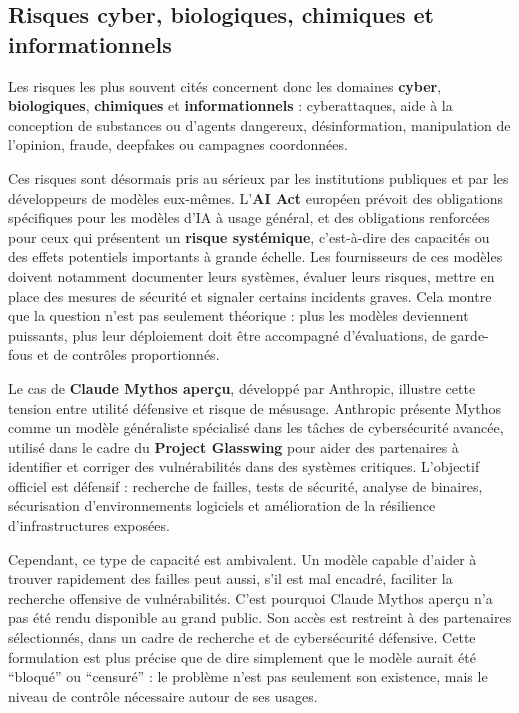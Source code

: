 \documentclass[
  10pt,
  a4paper,
  DIV=11,
  numbers=noendperiod,
  oneside]{scrreprt}
\let\oldtextbf\textbf
\renewcommand{\textbf}[1]{\oldtextbf{\textcolor{cmmnavy}{#1}}}
\begin{document}
\subsection{Risques cyber, biologiques, chimiques et
informationnels}\label{risques-cyber-biologiques-chimiques-et-informationnels}

Les risques les plus souvent cités concernent donc les domaines
\textbf{cyber}, \textbf{biologiques}, \textbf{chimiques} et
\textbf{informationnels} : cyberattaques, aide à la conception de
substances ou d'agents dangereux, désinformation, manipulation de
l'opinion, fraude, deepfakes ou campagnes coordonnées.

Ces risques sont désormais pris au sérieux par les institutions
publiques et par les développeurs de modèles eux-mêmes. L'\textbf{AI
Act} européen prévoit des obligations spécifiques pour les modèles d'IA
à usage général, et des obligations renforcées pour ceux qui présentent
un \textbf{risque systémique}, c'est-à-dire des capacités ou des effets
potentiels importants à grande échelle. Les fournisseurs de ces modèles
doivent notamment documenter leurs systèmes, évaluer leurs risques,
mettre en place des mesures de sécurité et signaler certains incidents
graves. Cela montre que la question n'est pas seulement théorique : plus
les modèles deviennent puissants, plus leur déploiement doit être
accompagné d'évaluations, de garde-fous et de contrôles proportionnés.

Le cas de \textbf{Claude Mythos aperçu}, développé par Anthropic,
illustre cette tension entre utilité défensive et risque de mésusage.
Anthropic présente Mythos comme un modèle généraliste spécialisé dans
les tâches de cybersécurité avancée, utilisé dans le cadre du
\textbf{Project Glasswing} pour aider des partenaires à identifier et
corriger des vulnérabilités dans des systèmes critiques. L'objectif
officiel est défensif : recherche de failles, tests de sécurité, analyse
de binaires, sécurisation d'environnements logiciels et amélioration de
la résilience d'infrastructures exposées.

Cependant, ce type de capacité est ambivalent. Un modèle capable d'aider
à trouver rapidement des failles peut aussi, s'il est mal encadré,
faciliter la recherche offensive de vulnérabilités. C'est pourquoi
Claude Mythos aperçu n'a pas été rendu disponible au grand public. Son
accès est restreint à des partenaires sélectionnés, dans un cadre de
recherche et de cybersécurité défensive. Cette formulation est plus
précise que de dire simplement que le modèle aurait été ``bloqué'' ou
``censuré'' : le problème n'est pas seulement son existence, mais le
niveau de contrôle nécessaire autour de ses usages.
\end{document}
